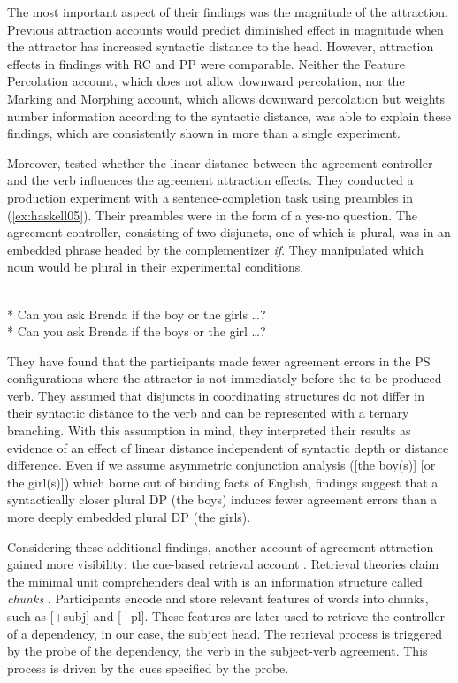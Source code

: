 The most important aspect of their findings was the magnitude of the attraction. Previous attraction accounts would predict diminished effect in magnitude when the attractor has increased syntactic distance to the head. However, attraction effects in \cites{WagersEtAl:2009} findings with RC and PP were comparable. Neither the Feature Percolation account, which does not allow downward percolation, nor the Marking and Morphing account, which allows downward percolation but weights number information according to the syntactic distance, was able to explain these findings, which are consistently shown in more than a single experiment.

Moreover,  tested whether the linear distance between the agreement controller and the verb influences the agreement attraction effects. They conducted a production experiment with a sentence-completion task using preambles in (\ref{ex:haskell05}). Their preambles were in the form of a yes-no question. The agreement controller, consisting of two disjuncts, one of which is plural, was in an embedded phrase headed by the complementizer \emph{if}. They manipulated which noun would be plural in their experimental conditions.

\ea \label{ex:haskell05}
   \\* Can you ask Brenda if {the boy or {the girls}} \ldots{}?
   \\* Can you ask Brenda if {{the boys} or the girl} \ldots{}?
  \z
\z

They have found that the participants made fewer agreement errors in the PS configurations where the attractor is not immediately before the to-be-produced verb. They assumed that disjuncts in coordinating structures do not differ in their syntactic distance to the verb and can be represented with a ternary branching. With this assumption in mind, they interpreted their results as evidence of an effect of linear distance independent of syntactic depth or distance difference. Even if we assume \cites{Progovac98} asymmetric conjunction analysis ([the boy(s)] [or the girl(s)]) which borne out of binding facts of English, \cites{HaskellMacDonald2005} findings suggest that a syntactically closer plural DP (the boys) induces fewer agreement errors than a more deeply embedded plural DP (the girls).

Considering these additional findings, another account of agreement attraction gained more visibility: the cue-based retrieval account \citep{WagersEtAl:2009, LagoEtAl2015}. Retrieval theories claim the minimal unit comprehenders deal with is an information structure called \emph{chunks} \citep{LewisVasishth:2005}. Participants encode and store relevant features of words into chunks, such as [+{subj}] and [+{pl}]. These features are later used to retrieve the controller of a dependency, in our case, the subject head. The retrieval process is triggered by the probe of the dependency, the verb in the subject-verb agreement. This process is driven by the cues specified by the probe. 

